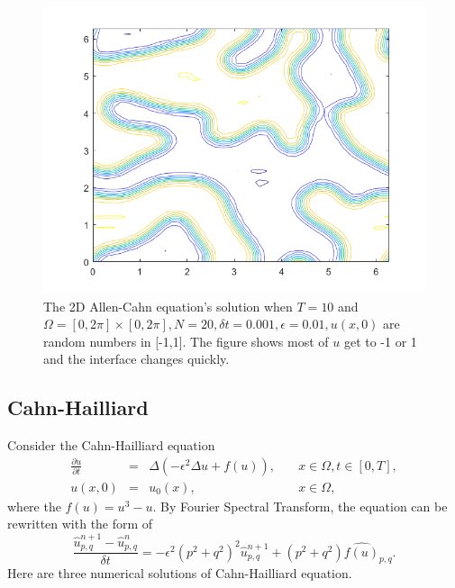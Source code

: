 \documentclass[a4paper]{article}
\begin{document}
\begin{figure}[h]
    \centering
    \includegraphics[scale=0.4]{2DAllen_Cahn2.png}
    \caption{The 2D Allen-Cahn equation's solution when $T=10$ and $\Omega = [0,2\pi]\times[0,2\pi], N = 20, \delta t=0.001, \epsilon=0.01, u(x,0)$ are random numbers in [-1,1]. The figure shows most of $u$ get to -1 or 1 and the interface changes quickly.}
    \label{im::2D_Allen_Cahn_rand}
\end{figure}
\newpage
\subsection{Cahn-Hailliard}
Consider the Cahn-Hailliard equation
\begin{equation}
\begin{array}{rccl}
    \frac{\partial u}{\partial t}&=&\Delta(-\epsilon^2\Delta u +f(u)),&\quad x\in\Omega, t\in[0,T],\\
    u(x,0)&=&u_0(x),&\quad x\in \Omega,
\end{array}
\end{equation}
where the $f(u)=u^3-u$.
By Fourier Spectral Transform, the equation can be rewritten with the form of 
\begin{equation}
    \frac{\hat{u}^{n+1}_{p,q}-\hat{u}^{n}_{p,q}}{\delta t}=-\epsilon^2(p^2+q^2)^2\hat{u}^{n+1}_{p,q}+(p^2+q^2)\hat{f(u)}_{p,q}.
\end{equation}
Here are three numerical solutions of Cahn-Hailliard equation.
\end{document}
